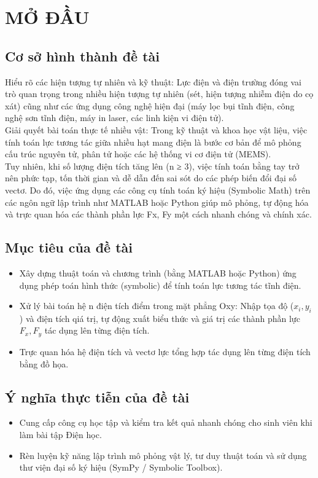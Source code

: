 \section{MỞ ĐẦU}
\subsection{Cơ sở hình thành đề tài}
    Hiểu rõ các hiện tượng tự nhiên và kỹ thuật: Lực điện và điện trường đóng vai trò quan trọng trong nhiều hiện tượng tự nhiên (sét, hiện tượng nhiễm điện do cọ xát) cũng như các ứng dụng công nghệ hiện đại (máy lọc bụi tĩnh điện, công nghệ sơn tĩnh điện, máy in laser, các linh kiện vi điện tử).\\
    
    Giải quyết bài toán thực tế nhiều vật: Trong kỹ thuật và khoa học vật liệu, việc tính toán lực tương tác giữa nhiều hạt mang điện là bước cơ bản để mô phỏng cấu trúc nguyên tử, phân tử hoặc các hệ thống vi cơ điện tử (MEMS).\\
    
    Tuy nhiên, khi số lượng điện tích tăng lên (n ≥ 3), việc tính toán bằng tay trở nên phức tạp, tốn thời gian và dễ dẫn đến sai sót do các phép biến đổi đại số vectơ. Do đó, việc ứng dụng các công cụ tính toán ký hiệu (Symbolic Math) trên các ngôn ngữ lập trình như MATLAB hoặc Python giúp mô phỏng, tự động hóa và trực quan hóa các thành phần lực Fx, Fy một cách nhanh chóng và chính xác.\\
\subsection{Mục tiêu của đề tài}
    \begin{itemize}[leftmargin=1.2cm]
    \item Xây dựng thuật toán và chương trình (bằng MATLAB hoặc Python) ứng dụng phép toán hình thức (symbolic) để tính toán lực tương tác tĩnh điện.
    \end{itemize}
    \begin{itemize}
    \item Xử lý bài toán hệ n điện tích điểm trong mặt phẳng Oxy: Nhập tọa độ ($x_i, y_i$)
    và điện tích qiá trị, tự động xuất biểu thức và giá trị các thành phần lực $F_x, F_y$ tác dụng lên từng điện tích.
    \item Trực quan hóa hệ điện tích và vectơ lực tổng hợp tác dụng lên từng điện tích bằng đồ họa.
    \end{itemize}
\subsection{Ý nghĩa thực tiễn của đề tài}
    \begin{itemize}[leftmargin=1.2cm]
    \item Cung cấp công cụ học tập và kiểm tra kết quả nhanh chóng cho sinh viên khi làm bài tập Điện học.
    \end{itemize}
    \begin{itemize}[leftmargin=1.2cm]
    \item Rèn luyện kỹ năng lập trình mô phỏng vật lý, tư duy thuật toán và sử dụng thư viện đại số ký hiệu (SymPy / Symbolic Toolbox).
    \end{itemize}
